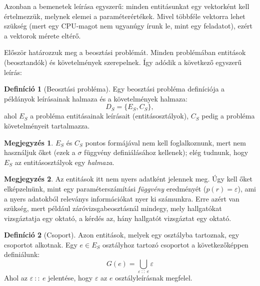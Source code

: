 \documentclass[twocolumn]{article}
\theoremstyle{definition}
\newtheorem{definition}{Definíció}[section]
\newtheorem*{megj}{Megjegyzés}
\newcommand{\set}[1]{ \{ {#1} \} }
\begin{document}
    Azonban a bemenetek leírása egyszerű: minden entitásunkat egy vektorként kell értelmezzük, melynek elemei a paraméterértékek. Mivel többféle vektorra lehet szükség (mert egy CPU-magot nem ugyanúgy írunk le, mint egy feladatot), ezért a vektorok mérete eltérő.
    
    Először határozzuk meg a beosztási problémát. Minden problémában entitások (beosztandók) és követelmények szerepelnek. Így adódik a következő egyszerű leírás:
    
    \begin{definition}[Beosztási probléma] \label{def:problema}
        Egy beosztási probléma definíciója a példányok leírásainak halmaza és a követelmények halmaza:
        \begin{equation}
            D_S = \set{E_S, C_S},
        \end{equation}
        ahol $E_S$ a probléma entitásainak leírásait (entitásosztályok), $C_S$ pedig a probléma követelményeit tartalmazza.
        \begin{megj}
            $E_S$ és $C_S$ pontos formájával nem kell foglalkoznunk, mert nem használjuk őket (ezek a $\sigma$ függvény definiálásához kellenek); elég tudnunk, hogy $E_S$ az entitásosztályok egy {\it halmaza}.
        \end{megj}
        \begin{megj} \label{megj:param_func}
            Az entitások itt nem nyers adatként jelennek meg. Úgy kell őket elképzelnünk, mint egy paraméterszámítási {\it függvény} eredményét ($p(r) = \varepsilon$), ami a nyers adatokból releványs információkat nyer ki számunkra. Erre azért van szükség, mert például záróvizsgabeosztásnál mindegy, mely hallgatókat vizsgáztatja egy oktató, a kérdés az, hány hallgatót vizsgáztat egy oktató.
        \end{megj}
    \end{definition}
    
    \begin{definition}[Csoport]
        Azon entitások, melyek egy osztályba tartoznak, egy csoportot alkotnak. Egy $e \in E_S$ osztályhoz tartozó csoportot a következőképpen definiálunk:
        \begin{equation}
            G(e) = \bigcup_{\varepsilon \ :: \ e} \varepsilon
        \end{equation}
        Ahol az $\varepsilon \ :: \ e$ jelentése, hogy $\varepsilon$ az $e$ osztályleírásnak megfelel. 
    \end{definition}
    
\end{document}
